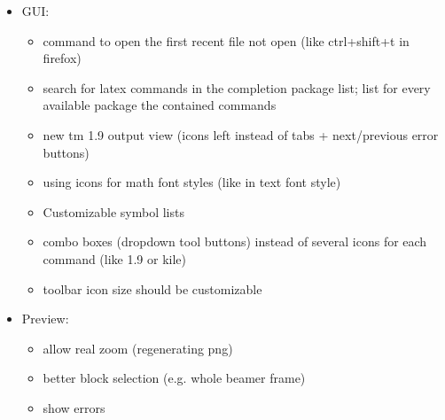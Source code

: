 \documentclass[10pt,a4paper,landscape]{report}
\begin{document}
\begin{itemize}
\begin{itemize}
	\item \verb+\begin{Umgebungsname}+ should not add \verb+\end{Umgebungsname}+ if that \textbackslash end is already in the next/a later line
	 	\item Open completion list of xyz if cursor is after \verb+\xyz{+ (= ignore \verb+{}+ before cursor)
		\item treat \verb+\+abc\{\%<xyz\%>\} and \verb+\+abc\{\%<def\%>\} as identical and ignore one of them (in the list of possible completions)
		\item Understand \verb+newcounter, tex: \newcount \newfont \def, \edef, \xdef, \gdef+
		\item Detect completion within tikz/pstricks/... environments and show a list of corresponding tikz/... commands
		\item text completion should show parameters of commands (e.g. reference names) even if they aren't currently used
		\item merging text completion and spell checker cache?
	\end{itemize}
	\item GUI: \begin{itemize}
		\item command to open the first recent file not open (like ctrl+shift+t in firefox)
		\item search for latex commands in the completion package list; list for every available package the contained commands
		\item new tm 1.9 output view (icons left instead of tabs + next/previous error buttons)
		\item using icons for math font styles (like in text font style)
		\item Customizable symbol lists
		\item combo boxes (dropdown tool buttons) instead of several icons for each command (like 1.9 or kile)
		\item toolbar icon size should be customizable
	\end{itemize}
	\item Preview: \begin{itemize}
		\item allow real zoom (regenerating png)
		\item better block selection (e.g. whole beamer frame)
		\item show errors
		

\end{itemize}
\end{itemize}
\end{document}
